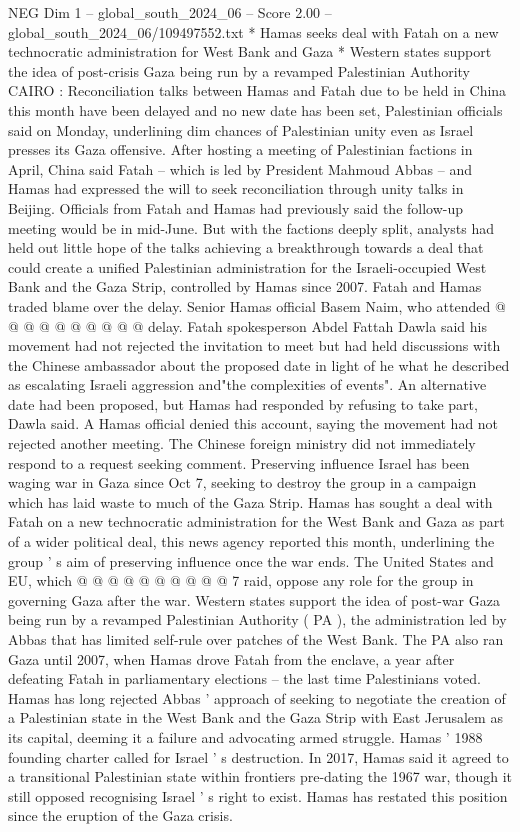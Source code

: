 \begin{textsample}{NEG Dim 1 – global\_south\_2024\_06 – Score 2.00 – global\_south\_2024\_06/109497552.txt}  \label{ex:f1_neg_408}
* Hamas seeks deal with Fatah on a new technocratic administration for West Bank and Gaza * Western states support the idea of post-crisis Gaza being run by a revamped Palestinian Authority CAIRO : Reconciliation talks between Hamas and Fatah due to be held in China this month have been delayed and no new date has been set, Palestinian officials said on Monday, underlining dim chances of Palestinian unity even as Israel presses its Gaza offensive.
After hosting a meeting of Palestinian factions in April, China said Fatah -- which is led by President Mahmoud Abbas -- and Hamas had expressed the will to seek reconciliation through unity talks in Beijing.
Officials from Fatah and Hamas had previously said the follow-up meeting would be in mid-June.
But with the factions deeply split, analysts had held out little hope of the talks achieving a breakthrough towards a deal that could create a unified Palestinian administration for the Israeli-occupied West Bank and the Gaza Strip, controlled by Hamas since 2007.
Fatah and Hamas traded blame over the delay.
Senior Hamas official Basem Naim, who attended @ @ @ @ @ @ @ @ @ @ delay.
Fatah spokesperson Abdel Fattah Dawla said his movement had not rejected the invitation to meet but had held discussions with the Chinese ambassador about the proposed date in light of he what he described as escalating Israeli aggression and"the complexities of events".
An alternative date had been proposed, but Hamas had responded by refusing to take part, Dawla said.
A Hamas official denied this account, saying the movement had not rejected another meeting.
The Chinese foreign ministry did not immediately respond to a request seeking comment.
Preserving influence Israel has been waging war in Gaza since Oct 7, seeking to destroy the group in a campaign which has laid waste to much of the Gaza Strip.
Hamas has sought a deal with Fatah on a new technocratic administration for the West Bank and Gaza as part of a wider political deal, this news agency reported this month, underlining the group ' s aim of preserving influence once the war ends.
The United States and EU, which @ @ @ @ @ @ @ @ @ @ 7 raid, oppose any role for the group in governing Gaza after the war.
Western states support the idea of post-war Gaza being run by a revamped Palestinian Authority ( PA ), the administration led by Abbas that has limited self-rule over patches of the West Bank.
The PA also ran Gaza until 2007, when Hamas drove Fatah from the enclave, a year after defeating Fatah in parliamentary elections -- the last time Palestinians voted.
Hamas has long rejected Abbas ' approach of seeking to negotiate the creation of a Palestinian state in the West Bank and the Gaza Strip with East Jerusalem as its capital, deeming it a failure and advocating armed struggle.
Hamas ' 1988 founding charter called for Israel ' s destruction.
In 2017, Hamas said it agreed to a transitional Palestinian state within frontiers pre-dating the 1967 war, though it still opposed recognising Israel ' s right to exist.
Hamas has restated this position since the eruption of the Gaza crisis.

\end{textsample}
